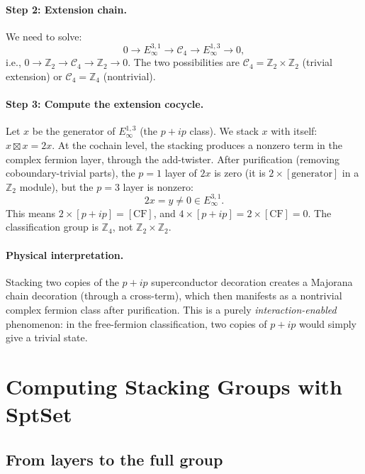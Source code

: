 \documentclass{SciPost}
\theoremstyle{definition}
\newcommand{\Zt}{\mathbb{Z}_2}
\newcommand{\Zn}[1]{\mathbb{Z}_{#1}}
\begin{document}
\paragraph{Step 2: Extension chain.}
We need to solve:
\begin{equation}
0 \to E_\infty^{3,1} \to \mathcal{C}_4 \to E_\infty^{1,3} \to 0,
\end{equation}
i.e., $0 \to \Zt \to \mathcal{C}_4 \to \Zt \to 0$.
The two possibilities are $\mathcal{C}_4 = \Zt \times \Zt$ (trivial extension) or $\mathcal{C}_4 = \Zn{4}$ (nontrivial).

\paragraph{Step 3: Compute the extension cocycle.}
Let $x$ be the generator of $E_\infty^{1,3}$ (the $p+ip$ class).
We stack $x$ with itself: $x \boxtimes x = 2x$.
At the cochain level, the stacking produces a nonzero term in the complex fermion layer, through the add-twister.
After purification (removing coboundary-trivial parts), the $p = 1$ layer of $2x$ is zero (it is $2 \times [\text{generator}]$ in a $\Zt$ module), but the $p = 3$ layer is nonzero:
\begin{equation}
2x = y \neq 0 \in E_\infty^{3,1}.
\end{equation}
This means $2 \times [p+ip] = [\text{CF}]$, and $4 \times [p+ip] = 2 \times [\text{CF}] = 0$.
The classification group is $\Zn{4}$, not $\Zt \times \Zt$.

\paragraph{Physical interpretation.}
Stacking two copies of the $p+ip$ superconductor decoration creates a Majorana chain decoration (through a cross-term), which then manifests as a nontrivial complex fermion class after purification.
This is a purely \emph{interaction-enabled} phenomenon: in the free-fermion classification, two copies of $p+ip$ would simply give a trivial state.

\section{Computing Stacking Groups with SptSet}
\label{sec:sptset-stacking}

\subsection{From layers to the full group}
\label{subsec:layers-to-group}
\end{document}
